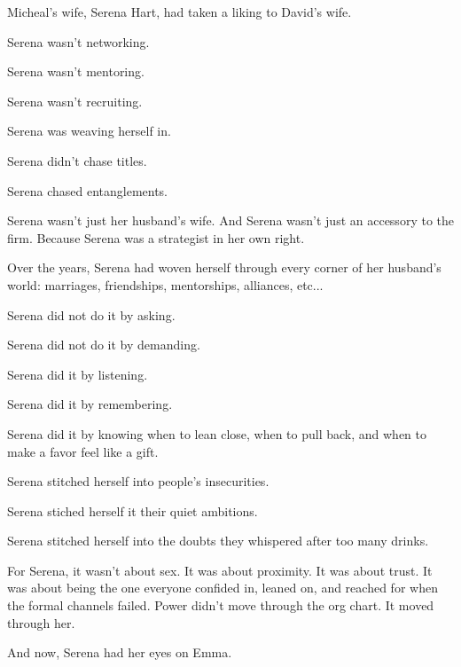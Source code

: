 Micheal's wife, Serena Hart, had taken a liking to David’s wife.

Serena wasn’t networking.  

Serena wasn’t mentoring.  

Serena wasn’t recruiting.  

Serena was weaving herself in.

Serena didn’t chase titles. 

Serena chased entanglements.  

Serena wasn’t just her husband’s wife. 
And Serena wasn’t just an accessory to the firm.  
Because Serena was a strategist in her own right. 

Over the years, Serena had woven herself through every corner of her husband’s world:  
marriages, friendships, mentorships, alliances, etc...  

Serena did not do it by asking. 

Serena did not do it by demanding.  

Serena did it by listening. 

Serena did it by remembering. 

Serena did it by knowing when to lean close, when to pull back, and when to make a favor feel like a gift.

Serena stitched herself into people’s insecurities. 

Serena stiched herself it their quiet ambitions. 

Serena stitched herself into the doubts they whispered after too many drinks.  

For Serena, it wasn’t about sex.  
It was about proximity.  
It was about trust.  
It was about being the one everyone confided in, 
leaned on, and reached for when the formal channels failed.
Power didn’t move through the org chart.  
It moved through her.  

And now, Serena had her eyes on Emma.

\medskip

